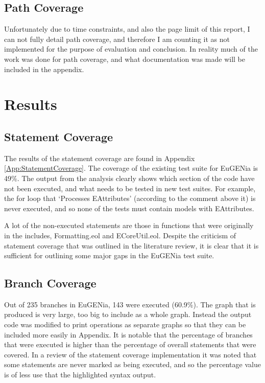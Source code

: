 \subsection{Path Coverage}

Unfortunately due to time constraints, and also the page limit of this report, I can not fully detail path coverage, and therefore I am counting it as not implemented for the purpose of evaluation and conclusion. In reality much of the work was done for path coverage, and what documentation was made will be included in the appendix.

\section{Results}

\subsection{Statement Coverage}

The results of the statement coverage are found in Appendix \ref{App:StatementCoverage}. The coverage of the existing test suite for EuGENia is 49\%. The output from the analysis clearly shows which section of the code have not been executed, and what needs to be tested in new test suites. For example, the for loop that `Processes EAttributes' (according to the comment above it) is never executed, and so none of the tests must contain models with EAttributes.

A lot of the non-executed statements are those in functions that were originally in the includes, Formatting.eol and ECoreUtil.eol. Despite the criticism of statement coverage that was outlined in the literature review, it is clear that it is sufficient for outlining some major gaps in the EuGENia test suite.

\subsection{Branch Coverage}

Out of 235 branches in EuGENia, 143 were executed (60.9\%). The graph that is produced is very large, too big to include as a whole graph. Instead the output code was modified to print operations as separate graphs so that they can be included more easily in Appendix. It is notable that the percentage of branches that were executed is higher than the percentage of overall statements that were covered. In a review of the statement coverage implementation it was noted that some statements are never marked as being executed, and so the percentage value is of less use that the highlighted syntax output.

